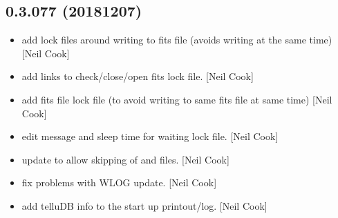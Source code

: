 \documentclass[a4paper,10pt,english]{report}
\begin{document}
\subsection{0.3.077 (2018\sphinxhyphen{}12\sphinxhyphen{}07)}
\label{\detokenize{misc/changelog:id264}}\begin{itemize}
\item {} 
 \sphinxhyphen{} add lock files around writing to fits file (avoids
writing at the same time) {[}Neil Cook{]}

\item {} 
 \sphinxhyphen{} add links to check/close/open fits lock
file. {[}Neil Cook{]}

\item {} 
 \sphinxhyphen{} add fits file lock file (to avoid writing to same fits
file at same time) {[}Neil Cook{]}

\item {} 
 \sphinxhyphen{} edit message and sleep time for waiting lock file. {[}Neil
Cook{]}

\item {} 
 \sphinxhyphen{} update to allow skipping of  and 
files. {[}Neil Cook{]}

\item {} 
 \sphinxhyphen{} fix problems with WLOG update. {[}Neil Cook{]}

\item {} 
 \sphinxhyphen{} add telluDB info to the start up printout/log.
{[}Neil Cook{]}

\end{itemize}
\end{document}
